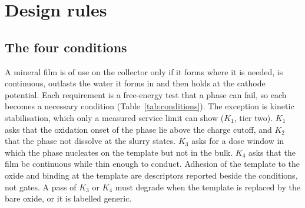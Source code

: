 \section{Design rules}\label{sec:design}

\subsection{The four conditions}\label{sec:conditions}

A mineral film is of use on the collector only if it forms where it is needed, is continuous, outlasts the water it forms in and then holds at the cathode potential. %
Each requirement is a free-energy test that a phase can fail, so each becomes a necessary condition (Table~\ref{tab:conditions}). %
The exception is kinetic stabilisation, which only a measured service limit can show ($K_1$, tier two). %
$K_1$ asks that the oxidation onset of the phase lie above the charge cutoff, and $K_2$ that the phase not dissolve at the slurry states. %
$K_3$ asks for a dose window in which the phase nucleates on the template but not in the bulk. %
$K_4$ asks that the film be continuous while thin enough to conduct. %
Adhesion of the template to the oxide and  binding at the template are descriptors reported beside the conditions, not gates. %
A pass of $K_3$ or $K_4$ must degrade when the template is replaced by the bare oxide, or it is labelled generic. %

